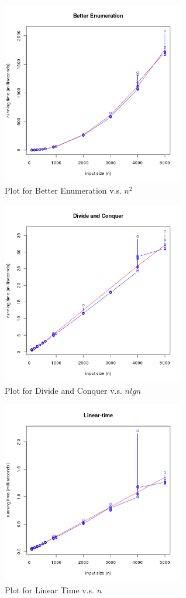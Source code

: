 \documentclass[11pt]{scrreprt}
\begin{document}
\begin{figure}[!htb]
\centering
\includegraphics[width=8cm]{better_enumeration.png}
\caption{Plot for Better Enumeration v.s. $n^2$}
\label{figc1}
\end{figure}

\begin{figure}[!htb]
\centering
\includegraphics[width=8cm]{divide_n_conquer.png}
\caption{Plot for Divide and Conquer v.s. $nlgn$}
\label{figc1}
\end{figure}

\begin{figure}[!htb]
\centering
\includegraphics[width=8cm]{linear_time.png}
\caption{Plot for Linear Time v.s. $n$}
\label{figc1}
\end{figure}
\end{document}
